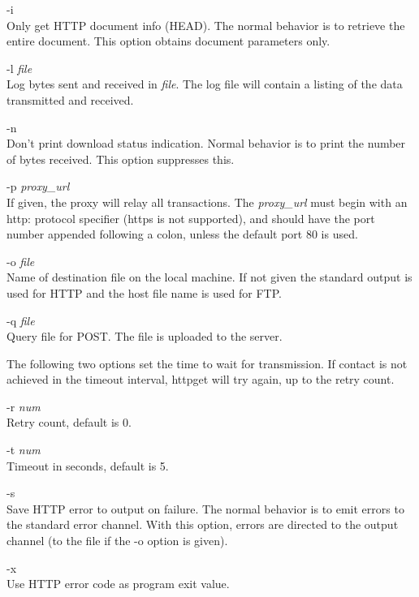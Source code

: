 \begin{description}
\item{\vt -i}\\
Only get HTTP document info (HEAD).  The normal behavior is to
retrieve the entire document.  This option obtains document parameters
only.

\item{\vt -l} {\it file}\\
Log bytes sent and received in {\it file\/}.  The log file will
contain a listing of the data transmitted and received.

\item{\vt -n}\\
Don't print download status indication.  Normal behavior is to print
the number of bytes received.  This option suppresses this.

\item{\vt -p} {\it proxy\_url}\\
If given, the proxy will relay all transactions.  The {\it proxy\_url}
must begin with an {\vt http:} protocol specifier ({\vt https} is not
supported), and should have the port number appended following a
colon, unless the default port 80 is used.

\item{\vt -o} {\it file}\\
Name of destination file on the local machine.  If not given the
standard output is used for HTTP and the host file name is used for
FTP.

\item{\vt -q} {\it file}\\
Query file for POST.  The file is uploaded to the server.
\end{description}

The following two options set the time to wait for transmission.  If
contact is not achieved in the timeout interval, {\vt httpget} will
try again, up to the retry count.

\begin{description}
\item{\vt -r} {\it num}\\
Retry count, default is 0.

\item{\vt -t} {\it num}\\
Timeout in seconds, default is 5.

\item{\vt -s}\\
Save HTTP error to output on failure.  The normal behavior is to emit
errors to the standard error channel.  With this option, errors are
directed to the output channel (to the file if the {\vt -o} option is
given).

\item{\vt -x}\\
Use HTTP error code as program exit value.
\end{description}


